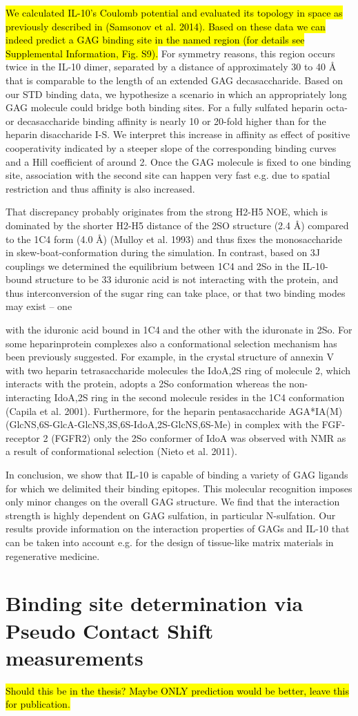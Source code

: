 \hl{We calculated IL-10's Coulomb potential and evaluated its topology in space
as previously described in (Samsonov et al. 2014). Based on these data we can
indeed predict a GAG binding site in the named region (for details see
Supplemental Information, Fig. S9).} For symmetry reasons, this region occurs
twice in the IL-10 dimer, separated by a distance of approximately 30 to 40 Å
that is comparable to the length of an extended GAG decasaccharide. Based on our
STD binding data, we hypothesize a scenario in which an appropriately long GAG
molecule could bridge both binding sites. For a fully sulfated heparin octa- or
decasaccharide binding affinity is nearly 10 or 20-fold higher than for the
heparin disaccharide I-S. We interpret this increase in affinity as effect of
positive cooperativity indicated by a steeper slope of the corresponding binding
curves and a Hill coefficient of around 2. Once the GAG molecule is fixed to one
binding site, association with the second site can happen very fast e.g. due to
spatial restriction and thus affinity is also increased.

That discrepancy probably originates from the strong H2-H5 NOE, which is
dominated by the shorter H2-H5 distance of the 2SO structure (2.4 Å) compared to
the 1C4 form (4.0 Å) (Mulloy et al. 1993) and thus fixes the monosaccharide in
skew-boat-conformation during the simulation. In contrast, based on 3J couplings
we determined the equilibrium between 1C4 and 2So in the IL-10-bound structure
to be 33 %
iduronic acid is not interacting with the protein, and thus interconversion of
the sugar ring can take place, or that two binding modes may exist – one

with the iduronic acid bound in 1C4 and the other with the iduronate in 2So. For
some heparinprotein complexes also a conformational selection mechanism has been
previously suggested. For example, in the crystal structure of annexin V with
two heparin tetrasaccharide molecules the IdoA,2S ring of molecule 2, which
interacts with the protein, adopts a 2So conformation whereas the non-
interacting IdoA,2S ring in the second molecule resides in the 1C4 conformation
(Capila et al. 2001). Furthermore, for the heparin pentasaccharide AGA*IA(M)
(GlcNS,6S-GlcA-GlcNS,3S,6S-IdoA,2S-GlcNS,6S-Me) in complex with the FGF-receptor
2 (FGFR2) only the 2So conformer of IdoA was observed with NMR as a result of
conformational selection (Nieto et al. 2011).

In conclusion, we show that IL-10 is capable of binding a variety of GAG ligands
for which we delimited their binding epitopes. This molecular recognition
imposes only minor changes on the overall GAG structure. We find that the
interaction strength is highly dependent on GAG sulfation, in particular
N-sulfation. Our results provide information on the interaction properties of
GAGs and IL-10 that can be taken into account e.g. for the design of tissue-like
matrix materials in regenerative medicine.

\section{Binding site determination via Pseudo Contact Shift measurements}
\hl{Should this be in the thesis? Maybe ONLY prediction would be better,
leave this for publication.}

\lipsum[1-5]